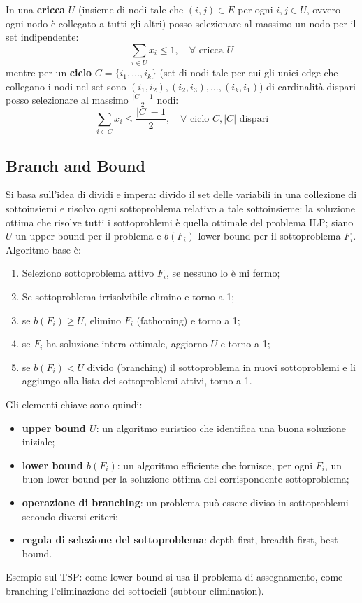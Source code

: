 In una \textbf{cricca} $U$ (insieme di nodi tale che $(i,j)\in E$ per ogni $i,j\in U$, ovvero ogni nodo è collegato a tutti gli altri) posso selezionare al massimo un nodo per il set indipendente:
\begin{equation*}
	\sum_{i\in U}x_i\le 1,\quad \forall \textrm{ cricca } U
\end{equation*}
mentre per un \textbf{ciclo} $C=\{i_1,\dots,i_k\}$ (set di nodi tale per cui gli unici edge che collegano i nodi nel set sono $(i_1,i_2), (i_2,i_3),\dots,(i_k,i_1)$) di cardinalità dispari posso selezionare al massimo $\frac{|C|-1}{2}$ nodi:
\begin{equation*}
	\sum_{i\in C}x_i\le \frac{|C|-1}{2},\quad \forall \textrm{ ciclo } C, |C| \textrm{ dispari}
\end{equation*}

\subsection{Branch and Bound}
Si basa sull'idea di dividi e impera: divido il set delle variabili in una collezione di sottoinsiemi e risolvo ogni sottoproblema relativo a tale sottoinsieme: la soluzione ottima che risolve tutti i sottoproblemi è quella ottimale del problema ILP; siano $U$ un upper bound per il problema e $b(F_i)$ lower bound per il sottoproblema $F_i$. Algoritmo base è:
\begin{enumerate}
	\item Seleziono sottoproblema attivo $F_i$, se nessuno lo è mi fermo;
	\item Se sottoproblema irrisolvibile elimino e torno a 1;
	\item se $b(F_i)\ge U$, elimino $F_i$ (fathoming) e torno a 1;
	\item se $F_i$ ha soluzione intera ottimale, aggiorno $U$ e torno a 1;
	\item se $b(F_i)<U$ divido (branching) il sottoproblema in nuovi sottoproblemi e li aggiungo alla lista dei sottoproblemi attivi, torno a 1.
\end{enumerate}

Gli elementi chiave sono quindi:
\begin{itemize}
	\item \textbf{upper bound $U$}: un algoritmo euristico che identifica una buona soluzione iniziale;
	\item \textbf{lower bound $b(F_i)$}: un algoritmo efficiente che fornisce, per ogni $F_i$, un buon lower bound per la soluzione ottima del corrispondente sottoproblema;
	\item \textbf{operazione di branching}: un problema può essere diviso in sottoproblemi secondo diversi criteri;
	\item \textbf{regola di selezione del sottoproblema}: depth first, breadth first, best bound.
\end{itemize}
Esempio sul TSP: come lower bound si usa il problema di assegnamento, come branching l'eliminazione dei sottocicli (subtour elimination).

